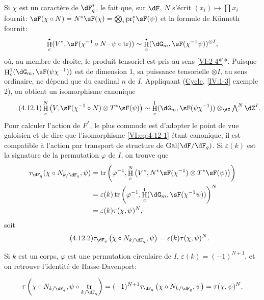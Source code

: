 \documentclass[oneside]{book}
\DeclareMathOperator{\gal}{Gal}
\DeclareMathOperator{\h}{H}
\DeclareMathOperator{\tr}{tr}
\newcommand{\pr}{\mathrm{pr}} %
\theoremstyle{sga-source}
\theoremstyle{sga-source-dash}
\theoremstyle{sga-source-dotdash}
\theoremstyle{sga-source-number-note-dash}
\theoremstyle{sga-source-note-number-dotdash}
\theoremstyle{sga-source-example-dotdash}
\theoremstyle{sga-source-inline-number}
\theoremstyle{sga-source-bare-number}
\theoremstyle{sga-source}
\let\oldbullet\bullet
\renewcommand{\bullet}{\textnormal{\tiny$\oldbullet$}}
\newcommand{\PrintPage}[1]{}\newcommand{\MathPage}[1]{}\newcommand{\PrintCite}[2]{#1}\newcommand{\var}[3]{#1}
\begin{document}
Si $\chi$ est un caractère de $\dF_q^\ast$, le fait que, sur $\dF$, $N$ 
s'écrit $(x_i)\mapsto \prod x_i$ fournit: 
$\sF(\chi\circ N)=\var{N^\ast\sF(\chi) = \bigotimes_i \pr_i^\ast\sF(\psi)}{N^\ast\sF(\chi) = \bigotimes_i \pr_i^\ast\sF(\chi)}{S45-SOL-0830}$ 
et la formule de K\"unneth fournit: 
\[
  \h_c^\bullet(V^\ast,\sF(\chi^{-1}\circ N\cdot \psi\circ \tr)) \sim \h_c^\bullet(\dG_m,\sF(\chi^{-1}\psi))^{\otimes I} \text{,} 
\]
où, au membre de droite, le produit tensoriel est pris au sens 
\ref{VI:2-4*}*. Puisque $\h_c^1(\dG_m,\sF(\psi\chi^{-1}))$ est de dimension 
$1$, sa puissance tensorielle $\otimes I$, au sens ordinaire, ne dépend que 
\var{du cardinal $n$ de $I$}{du cardinal $N$ de $I$}{S45-SOL-0832}. Appliquant (\hyperref[IV]{Cycle}, \ref{IV:1-3} exemple 
2), on obtient un isomorphisme canonique 
\begin{equation*}\tag{4.12.1}\label{VI:eq:4-12-1}
  \var{\h_c^N\left(V,}{\h_c^N\left(V^\ast,}{S45-SOL-0833}\sF(\chi^{-1}\circ N)\otimes T^\ast \sF(\psi)\right) \sim \var{\h_c^1(\dG_m,\sF(\psi\chi^{-1})) \otimes_\dZ}{\h_c^1(\dG_m,\sF(\psi\chi^{-1}))^{\otimes N} \otimes_\dZ}{S45-SOL-0834} \textstyle \bigwedge^N \dZ^I \text{.}
\end{equation*}
Pour calculer l'action de $F^\ast$, le plus commode est d'adopter le point de 
vue galoisien et de dire que l'isomorphisme \eqref{VI:eq:4-12-1} étant 
canonique, il est compatible à l'action par transport de structure de 
$\gal(\dF/\dF_q)$. Si $\varepsilon(k)$ est la signature de la permutation 
$\varphi$ de $I$, on trouve que 
\begin{align*} 
  \tau_{\dF_q}(\chi\circ N_{k/\dF_q},\psi) 
    &= \tr\left(\varphi^{-1},\h_c^N\left(V^\ast,N^\ast\sF(\chi^{-1})\otimes T^\ast \sF(\psi)\right)\right) \\ 
    &= \varepsilon(k) \tr\left(\varphi^{-1},\h_c^1(\dG_m,\sF(\chi^{-1}\psi))\right)^N \\
    &= \varepsilon(k) \tau(\chi,\psi)^N \text{,} 
\end{align*}
soit 
\begin{equation*}\tag{4.12.2}\label{VI:eq:4-12-2}
  \tau_{\dF_q}\left(\chi\circ N_{k/\dF_q},\psi\right) = \varepsilon(k) \tau(\chi,\psi)^N \text{.} 
\end{equation*}

Si $k$ est un corps, $\varphi$ est une permutation circulaire de $I$, 
$\varepsilon(k) = (-1)^{N+1}$, et on retrouve l'identité de Hasse-Davenport: 
\PrintPage{203}
\[
  \tau\left(\chi\circ N_{k/\dF_q},\psi\circ \tr_{k/\dF_q}\right) = (-1)^{N+1} \tau_{\dF_q}\left(\chi\circ N_{k/\dF_q},\psi\right) = \tau(\chi,\psi)^N \text{.} 
\]
\end{document}
